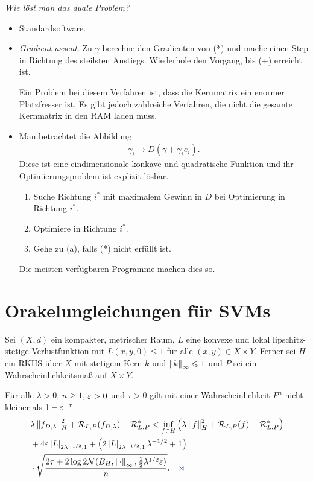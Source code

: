 \textit{Wie löst man das duale Problem?}
\begin{itemize}
  \item Standardsoftware.
  \item \emph{Gradient assent}. Zu $\gamma$ berechne den Gradienten von (*) und
  mache einen Step in Richtung des steilsten Anstiegs. Wiederhole den Vorgang,
  bis (+) erreicht ist.
  
  Ein Problem bei diesem Verfahren ist, dass die Kernmatrix ein enormer
  Platzfresser ist. Es gibt jedoch zahlreiche Verfahren, die nicht die gesamte
  Kernmatrix in den RAM laden muss.
  \item Man betrachtet die Abbildung
\begin{align*}
\gamma_i \mapsto D(\gamma + \gamma_ie_i).
\end{align*}
Diese ist eine eindimensionale konkave und quadratische Funktion und ihr
Optimierungsproblem ist explizit lösbar.
\begin{enumerate}
  \item Suche Richtung $i^*$ mit maximalem Gewinn in $D$ bei Optimierung in
  Richtung $i^*$.
  \item Optimiere in Richtung $i^*$.
  \item Gehe zu (a), falls (*) nicht erfüllt ist.
\end{enumerate}
Die meisten verfügbaren Programme machen dies so.
\end{itemize}

\section{Orakelungleichungen für SVMs}

\begin{prop}
\label{prop:6.2.1}
Sei $(X,d)$ ein kompakter, metrischer Raum, $L$ eine konvexe und lokal
lipschitz-stetige Verlustfunktion mit $L(x,y,0) \le 1$ für alle $(x,y)\in
X\times Y$. Ferner sei $H$ ein RKHS über $X$ mit stetigem Kern $k$ und
$\left\|k\right\|_\infty \leqslant 1$ und $P$ sei ein Wahrscheinlichkeitsmaß auf $X\times Y$.

Für alle $\lambda > 0$, $n\ge 1$, $\varepsilon > 0$ und $\tau > 0$ gilt mit einer
Wahrscheinlichkeit $P^n$ nicht kleiner als $1-\varepsilon^{-\tau}$:
\begin{align*}
&\lambda\norm{f_{D,\lambda}}_H^2 + \RR_{L,P}(f_{D,\lambda})-\RR_{L,P}^*
< \inf_{f\in H}\left( \lambda\norm{f}_H^2 + \RR_{L,P}(f) - \RR_{L,P}^* \right)\\
&+ 4\ep \abs{L}_{2\lambda^{-1/2},1}
+ \left(2\abs{L}_{2\lambda^{-1/2},1}\lambda^{-1/2} + 1 \right)\\
&\cdot \sqrt{\frac{2\tau +2\log 2\NN(B_H, \norm{\cdot}_\infty,
\frac{1}{2}\lambda^{1/2}\ep)}{n}}.\fishhere
\end{align*}
\end{prop}

